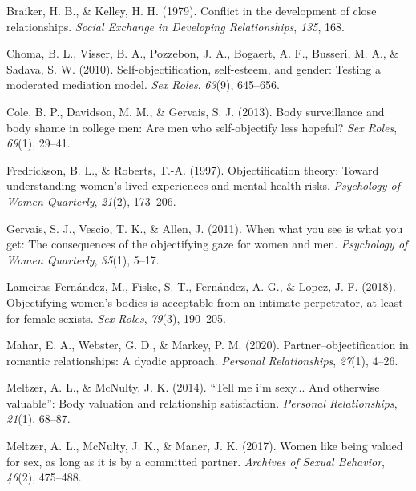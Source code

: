 \documentclass[
  man]{apa6}
\newlength{\cslhangindent}
\newlength{\cslentryspacingunit} %
\newenvironment{CSLReferences}[2] %
 {%
  \setlength{\parindent}{0pt}
  \ifodd #1
  \let\oldpar\par
  \def\par{\hangindent=\cslhangindent\oldpar}
  \fi
  \setlength{\parskip}{#2\cslentryspacingunit}
 }%
 {}
\begin{document}
\hypertarget{refs}{}
\begin{CSLReferences}{1}{0}
\leavevmode{}%
Braiker, H. B., \& Kelley, H. H. (1979). Conflict in the development of close relationships. \emph{Social Exchange in Developing Relationships}, \emph{135}, 168.

\leavevmode{}%
Choma, B. L., Visser, B. A., Pozzebon, J. A., Bogaert, A. F., Busseri, M. A., \& Sadava, S. W. (2010). Self-objectification, self-esteem, and gender: Testing a moderated mediation model. \emph{Sex Roles}, \emph{63}(9), 645--656.

\leavevmode{}%
Cole, B. P., Davidson, M. M., \& Gervais, S. J. (2013). Body surveillance and body shame in college men: Are men who self-objectify less hopeful? \emph{Sex Roles}, \emph{69}(1), 29--41.

\leavevmode{}%
Fredrickson, B. L., \& Roberts, T.-A. (1997). Objectification theory: Toward understanding women's lived experiences and mental health risks. \emph{Psychology of Women Quarterly}, \emph{21}(2), 173--206.

\leavevmode{}%
Gervais, S. J., Vescio, T. K., \& Allen, J. (2011). When what you see is what you get: The consequences of the objectifying gaze for women and men. \emph{Psychology of Women Quarterly}, \emph{35}(1), 5--17.

\leavevmode{}%
Lameiras-Fernández, M., Fiske, S. T., Fernández, A. G., \& Lopez, J. F. (2018). Objectifying women's bodies is acceptable from an intimate perpetrator, at least for female sexists. \emph{Sex Roles}, \emph{79}(3), 190--205.

\leavevmode{}%
Mahar, E. A., Webster, G. D., \& Markey, P. M. (2020). Partner--objectification in romantic relationships: A dyadic approach. \emph{Personal Relationships}, \emph{27}(1), 4--26.

\leavevmode{}%
Meltzer, A. L., \& McNulty, J. K. (2014). {``Tell me i'm sexy... And otherwise valuable''}: Body valuation and relationship satisfaction. \emph{Personal Relationships}, \emph{21}(1), 68--87.

\leavevmode{}%
Meltzer, A. L., McNulty, J. K., \& Maner, J. K. (2017). Women like being valued for sex, as long as it is by a committed partner. \emph{Archives of Sexual Behavior}, \emph{46}(2), 475--488.


\end{CSLReferences}
\end{document}
